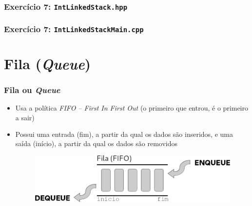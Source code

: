 \documentclass[aspectratio=169]{beamer}
\begin{document}
\begin{frame}[fragile]\frametitle{Exercício 7: \texttt{IntLinkedStack.hpp}}

\end{frame}

\begin{frame}[fragile]\frametitle{Exercício 7: \texttt{IntLinkedStackMain.cpp}}
\fontsize{6pt}{6pt}\selectfont{

}
\end{frame}

\section{Fila (\emph{Queue})}

\begin{frame}\frametitle{Fila ou \emph{Queue}}
\begin{itemize}
	\item Usa a política \emph{FIFO -- First In First Out} (o primeiro que entrou, é o primeiro a sair)
	\item Possui uma entrada (fim), a partir da qual os dados são inseridos, e uma saída (início), a partir da qual os dados são removidos
\begin{figure}[h]
	\centering
	\includegraphics[height=0.3\paperheight]{imagens/fila.png}
\end{figure}
\end{itemize}
\end{frame}
\end{document}
